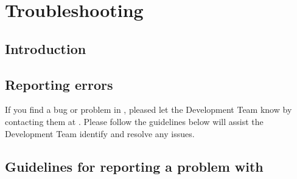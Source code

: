 \section{Troubleshooting\label{sec:trouble-shooting}}

\subsection{Introduction}

\subsection{Reporting errors\label{sec:reporting-errors}}

If you find a bug or problem in \CNAME , pleased let the Development Team know by contacting them at \email. Please follow the guidelines below will assist the Development Team identify and resolve any issues.

\subsection{Guidelines for reporting a problem with \CNAME\label{sec:error-guidelines}}

